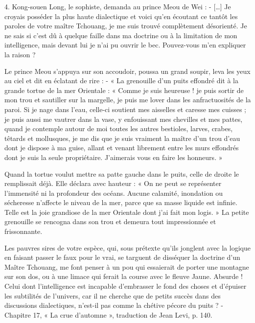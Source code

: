   \begin{singlequote}
      4. Kong-souen Long, le sophiste, demanda au prince Meou de Wei : - […] Je croyais posséder la plus haute dialectique et voici qu’en écoutant ce tantôt les paroles de votre maître Tchouang, je me suis trouvé complètement désorienté. Je ne sais si c’est dû à quelque faille dans ma doctrine ou à la limitation de mon intelligence, mais devant lui je n’ai pu ouvrir le bec. Pouvez-vous m’en expliquer la raison ?  

      Le prince Meou s’appuya sur son accoudoir, poussa un grand soupir, leva les yeux au ciel et dit en éclatant de rire :  
      - « La grenouille d’un puits effondré dit à la grande tortue de la mer Orientale : « Comme je suis heureuse ! je puis sortir de mon trou et sautiller sur la margelle, je puis me lover dans les anfractuosités de la paroi. Si je nage dans l’eau, celle-ci soutient mes aisselles et caresse mes cuisses ; je puis aussi me vautrer dans la vase, y enfouissant mes chevilles et mes pattes, quand je contemple autour de moi toutes les autres bestioles, larves, crabes, têtards et mollusques, je me dis que je suis vraiment la maître d’un trou d’eau dont je dispose à ma guise, allant et venant librement entre les murs effondrés dont je suis la seule propriétaire. J’aimerais vous en faire les honneurs. »  
      
      Quand la tortue voulut mettre sa patte gauche dans le puits, celle de droite le remplissait déjà. Elle déclara avec hauteur : « On ne peut se représenter l’immensité ni la profondeur des océans. Aucune calamité, inondation ou sécheresse n’affecte le niveau de la mer, parce que sa masse liquide est infinie. Telle est la joie grandiose de la mer Orientale dont j’ai fait mon logis. » La petite grenouille se rencogna dans son trou et demeura tout impressionnée et frissonnante.  
      
      Les pauvres sires de votre espèce, qui, sous prétexte qu’ils jonglent avec la logique en faisant passer le faux pour le vrai, se targuent de disséquer la doctrine d’un Maître Tchouang, me font penser à un pou qui essaierait de porter une montagne sur son dos, ou à une limace qui ferait la course avec le fleuve Jaune. Absurde ! Celui dont l’intelligence est incapable d’embrasser le fond des choses et d’épuiser les subtilités de l’univers, car il ne cherche que de petits succès dans des discussions dialectiques, n’est-il pas comme la chétive pécore du puits ?   - Chapitre 17, « La crue d’automne », traduction de Jean Levi, p. 140.  
  \end{singlequote}
  
